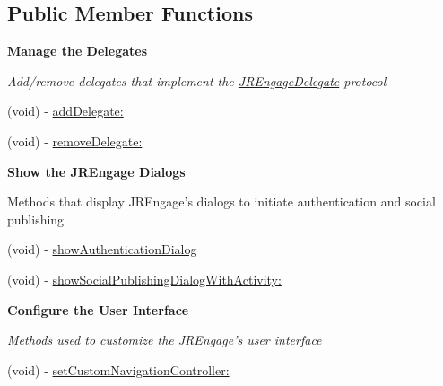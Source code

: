 \subsection*{Public Member Functions}
\begin{Indent}{\bf Manage the Delegates}\par
{\em \label{_amgrpf6bb425cb9b7388d33e37d551db6b02e}
 Add/remove delegates that implement the \hyperlink{protocol_j_r_engage_delegate-p}{JREngageDelegate} protocol }\begin{DoxyCompactItemize}
\item 
(void) -\/ \hyperlink{interface_j_r_engage_a18377ffb55f821587e6d38b3489692e8}{addDelegate:}
\item 
(void) -\/ \hyperlink{interface_j_r_engage_ab3f12ac148ea0f6df4d7ff7789cc7c94}{removeDelegate:}
\end{DoxyCompactItemize}
\end{Indent}
\begin{Indent}{\bf Show the JREngage Dialogs}\par
{\em \label{_amgrp345603279e1df04f4a3678e78089b7be}
 \label{interface_j_r_engage_showMethods}
\hypertarget{interface_j_r_engage_showMethods}{}


Methods that display JREngage's dialogs to initiate authentication and social publishing }\begin{DoxyCompactItemize}
\item 
(void) -\/ \hyperlink{interface_j_r_engage_a01ecdff491f91543e18f33d0e565b046}{showAuthenticationDialog}
\item 
(void) -\/ \hyperlink{interface_j_r_engage_afca7b5ab9a57edc1a460aaec882207c4}{showSocialPublishingDialogWithActivity:}
\end{DoxyCompactItemize}
\end{Indent}
\begin{Indent}{\bf Configure the User Interface}\par
{\em \label{_amgrp94e7ef441fcaa606cadd8cfd8b428e50}
 Methods used to customize the JREngage's user interface }\begin{DoxyCompactItemize}
\item 
(void) -\/ \hyperlink{interface_j_r_engage_a6c704bbff377d20603e6b52bd0ae17f1}{setCustomNavigationController:}
\end{DoxyCompactItemize}
\end{Indent}
